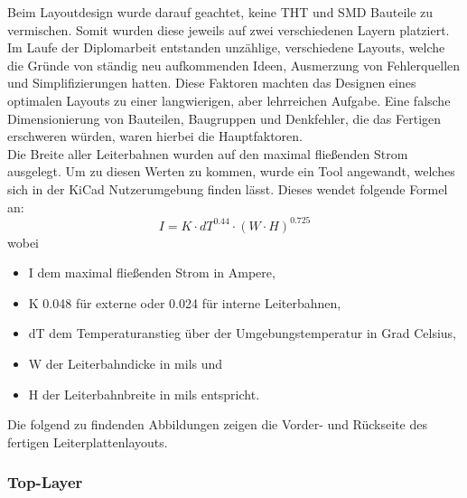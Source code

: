 Beim Layoutdesign wurde darauf geachtet, keine \acs{THT} und SMD Bauteile zu vermischen.
Somit wurden diese jeweils auf zwei verschiedenen Layern platziert. \\
Im Laufe der Diplomarbeit entstanden unzählige, verschiedene Layouts, welche die Gründe von ständig neu aufkommenden Ideen, Ausmerzung von Fehlerquellen und Simplifizierungen hatten.
Diese Faktoren machten das Designen eines optimalen Layouts zu einer langwierigen, aber lehrreichen Aufgabe.
Eine falsche Dimensionierung von Bauteilen, Baugruppen und Denkfehler, die das Fertigen erschweren würden, waren hierbei die Hauptfaktoren. \\

Die Breite aller Leiterbahnen wurden auf den maximal fließenden Strom ausgelegt.
Um zu diesen Werten zu kommen, wurde ein Tool angewandt, welches sich in der KiCad Nutzerumgebung finden lässt.
Dieses wendet folgende Formel an: \\

\begin{equation}
    I = K \cdot dT^{0.44} \cdot (W \cdot H)^{0.725}
\end{equation}
wobei
\begin{itemize}
    \item I dem maximal fließenden Strom in Ampere,
    \item K 0.048 für externe oder 0.024 für interne Leiterbahnen,
    \item dT dem Temperaturanstieg über der Umgebungstemperatur in Grad Celsius,
    \item W der Leiterbahndicke in mils und
    \item H der Leiterbahnbreite in mils entspricht.
\end{itemize}

Die folgend zu findenden Abbildungen zeigen die Vorder- und Rückseite des fertigen Leiterplattenlayouts.

\newpage
\subsubsection{Top-Layer}

